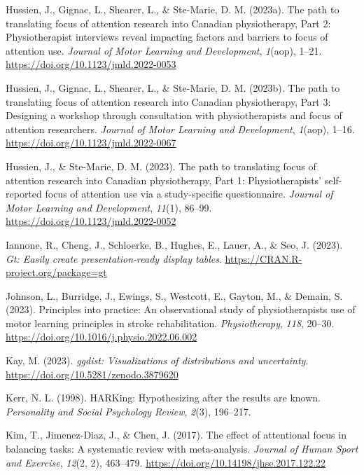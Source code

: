 \documentclass[
  man, donotrepeattitle,floatsintext]{apa7}
\newlength{\cslhangindent}
\newlength{\cslentryspacingunit} %
\newenvironment{CSLReferences}[2] %
 {%
  \setlength{\parindent}{0pt}
  \ifodd #1
  \let\oldpar\par
  \def\par{\hangindent=\cslhangindent\oldpar}
  \fi
  \setlength{\parskip}{#2\cslentryspacingunit}
 }%
 {}
\begin{document}
\begin{CSLReferences}{1}{0}
\leavevmode{}%
Hussien, J., Gignac, L., Shearer, L., \& Ste-Marie, D. M. (2023a). The path to translating focus of attention research into {Canadian} physiotherapy, {Part} 2: {Physiotherapist} interviews reveal impacting factors and barriers to focus of attention use. \emph{Journal of Motor Learning and Development}, \emph{1}(aop), 1--21. \url{https://doi.org/10.1123/jmld.2022-0053}

\leavevmode{}%
Hussien, J., Gignac, L., Shearer, L., \& Ste-Marie, D. M. (2023b). The path to translating focus of attention research into {Canadian} physiotherapy, {Part} 3: {Designing} a workshop through consultation with physiotherapists and focus of attention researchers. \emph{Journal of Motor Learning and Development}, \emph{1}(aop), 1--16. \url{https://doi.org/10.1123/jmld.2022-0067}

\leavevmode{}%
Hussien, J., \& Ste-Marie, D. M. (2023). The path to translating focus of attention research into {Canadian} physiotherapy, {Part} 1: {Physiotherapists}' self-reported focus of attention use via a study-specific questionnaire. \emph{Journal of Motor Learning and Development}, \emph{11}(1), 86--99. \url{https://doi.org/10.1123/jmld.2022-0052}

\leavevmode{}%
Iannone, R., Cheng, J., Schloerke, B., Hughes, E., Lauer, A., \& Seo, J. (2023). \emph{Gt: Easily create presentation-ready display tables}. \url{https://CRAN.R-project.org/package=gt}

\leavevmode{}%
Johnson, L., Burridge, J., Ewings, S., Westcott, E., Gayton, M., \& Demain, S. (2023). Principles into practice: {An} observational study of physiotherapists use of motor learning principles in stroke rehabilitation. \emph{Physiotherapy}, \emph{118}, 20--30. \url{https://doi.org/10.1016/j.physio.2022.06.002}

\leavevmode{}%
Kay, M. (2023). \emph{{ggdist}: Visualizations of distributions and uncertainty}. \url{https://doi.org/10.5281/zenodo.3879620}

\leavevmode{}%
Kerr, N. L. (1998). HARKing: Hypothesizing after the results are known. \emph{Personality and Social Psychology Review}, \emph{2}(3), 196--217.

\leavevmode{}%
Kim, T., Jimenez-Diaz, J., \& Chen, J. (2017). The effect of attentional focus in balancing tasks: {A} systematic review with meta-analysis. \emph{Journal of Human Sport and Exercise}, \emph{12}(2, 2), 463--479. \url{https://doi.org/10.14198/jhse.2017.122.22}


\end{CSLReferences}
\end{document}
